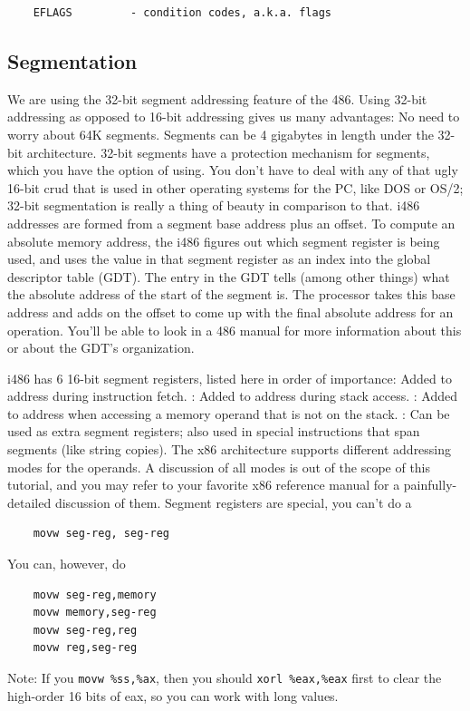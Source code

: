 \documentclass{note}
\begin{document}
{\begin{verbatim}
    EFLAGS         - condition codes, a.k.a. flags
\end{verbatim}

\subsection{Segmentation}
We are using the 32-bit segment addressing feature of the 486. Using 32-bit addressing as opposed to 16-bit addressing gives us many advantages:
No need to worry about 64K segments. Segments can be 4 gigabytes in length under the 32-bit architecture.
32-bit segments have a protection mechanism for segments, which you have the option of using.
You don't have to deal with any of that ugly 16-bit crud that is used in other operating systems for the PC, like DOS or OS/2; 32-bit segmentation is really a thing of beauty in comparison to that.
i486 addresses are formed from a segment base address plus an offset. To compute an absolute memory address, the i486 figures out which segment register is being used, and uses the value in that segment register as an index into the global descriptor table (GDT). The entry in the GDT tells (among other things) what the absolute address of the start of the segment is. The processor takes this base address and adds on the offset to come up with the final absolute address for an operation. You'll be able to look in a 486 manual for more information about this or about the GDT's organization.

i486 has 6 16-bit segment registers, listed here in order of importance:
\ben
\w {}
Added to address during instruction fetch.
\w {}:
Added to address during stack access.
\w {}:
Added to address when accessing a memory operand that is not on the stack.
\w {}:
Can be used as extra segment registers; also used in special instructions that
span segments (like string copies).
\een
The x86 architecture supports different addressing modes for the operands. A discussion of all modes is out of the scope of this tutorial, and you may refer to your favorite x86 reference manual for a painfully-detailed discussion of them. Segment registers are special, you can't do a
\begin{verbatim}
    movw seg-reg, seg-reg
\end{verbatim}
You can, however, do
\begin{verbatim}
    movw seg-reg,memory
    movw memory,seg-reg
    movw seg-reg,reg
    movw reg,seg-reg
\end{verbatim}
Note: If you \verb+movw %ss,%ax+, then you should \verb+xorl %eax,%eax+ first to clear the high-order 16 bits of eax, so you can work with long values.
 
}
\end{document}
